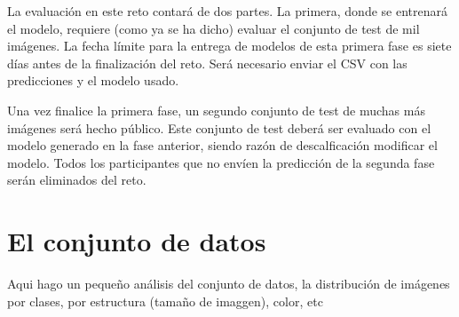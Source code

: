 La evaluación en este reto contará de dos partes. La primera, donde se entrenará el modelo, requiere (como ya se ha dicho) evaluar el conjunto de test de mil imágenes. La fecha límite para la entrega de modelos de esta primera fase es siete días antes de la finalización del reto. Será necesario enviar el CSV con las predicciones y el modelo usado.

Una vez finalice la primera fase, un segundo conjunto de test de muchas más imágenes será hecho público. Este conjunto de test deberá ser evaluado con el modelo generado en la fase anterior, siendo razón de descalficación modificar el modelo. Todos los participantes que no envíen la predicción de la segunda fase serán eliminados del reto.

\section{El conjunto de datos}

Aqui hago un pequeño análisis del conjunto de datos, la distribución de imágenes por clases, por estructura (tamaño de imaggen), color, etc

